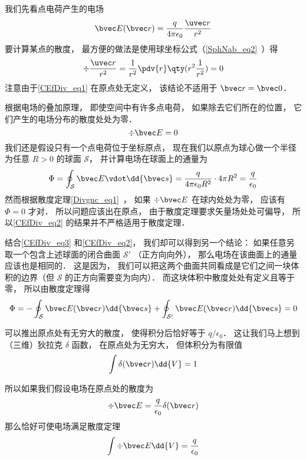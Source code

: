 

我们先看点电荷产生的电场
\begin{equation}\label{CEfDiv_eq1}
\bvec E(\bvec r) = \frac{q}{4\pi\epsilon_0}\frac{\uvec r}{r^2}
\end{equation}
要计算某点的散度， 最方便的做法是使用球坐标公式（\autoref{SphNab_eq2}~）得
\begin{equation}
\div \frac{\uvec r}{r^2} = \frac{1}{r^2} \pdv{r} \qty(r^2 \frac{1}{r^2}) = 0
\end{equation}
注意由于\autoref{CEfDiv_eq1} 在原点处无定义， 该结论不适用于 $\bvec r = \bvec 0$．

根据电场的叠加原理， 即使空间中有许多点电荷， 如果除去它们所在的位置， 它们产生的电场分布的散度处处为零．
\begin{equation}\label{CEfDiv_eq3}
\div \bvec E = 0
\end{equation}
我们还是假设只有一个点电荷位于坐标原点， 现在我们以原点为球心做一个半径为任意 $R > 0$ 的球面 $\mathcal S$， 并计算电场在球面上的通量为
\begin{equation}\label{CEfDiv_eq2}
\Phi = \oint_{\mathcal S} \bvec E \vdot \dd{\bvec s} = \frac{q}{4\pi\epsilon_0 R^2} \cdot 4\pi R^2 = \frac{q}{\epsilon_0}
\end{equation}
然而根据散度定理\autoref{Divgnc_eq1}~， 如果 $\div \bvec E$ 在球内处处为零， 应该有 $\Phi = 0$ 才对． 所以问题应该出在原点， 由于散度定理要求矢量场处处可偏导， 所以\autoref{CEfDiv_eq2} 的结果并不严格适用于散度定理．

结合\autoref{CEfDiv_eq3} 和\autoref{CEfDiv_eq2}， 我们却可以得到另一个结论： 如果任意另取一个包含上述球面的闭合曲面 $\mathcal S'$ （正方向向外）， 那么电场在该曲面上的通量应该也是相同的． 这是因为， 我们可以把这两个曲面共同看成是它们之间一块体积的边界（但 $\mathcal S$ 的正方向需要变为向内）． 而这块体积中散度处处有定义且等于零， 所以由散度定理得
\begin{equation}
\Phi = -\oint_{\mathcal S} \bvec E(\bvec r)\dd{\bvec s} + \oint_{\mathcal S'} \bvec E(\bvec r)\dd{\bvec s} = 0
\end{equation}


可以推出原点处有无穷大的散度， 使得积分后恰好等于 $q/\epsilon_0$． 这让我们马上想到（三维）狄拉克 $\delta$ 函数， 在原点处为无穷大， 但体积分为有限值
\begin{equation}
\int \delta(\bvec r)\dd{V} = 1
\end{equation}

所以如果我们假设电场在原点处的散度为
\begin{equation}
\div \bvec E = \frac{q}{\epsilon_0}\delta(\bvec r)
\end{equation}
那么恰好可使电场满足散度定理
\begin{equation}
\int \div \bvec E \dd{V} = \frac{q}{\epsilon_0}
\end{equation}
